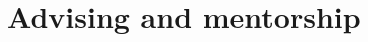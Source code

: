 \documentclass[12pt, letterpaper]{apw-cv}
\begin{document}
\section*{Advising and mentorship}







\end{document}
